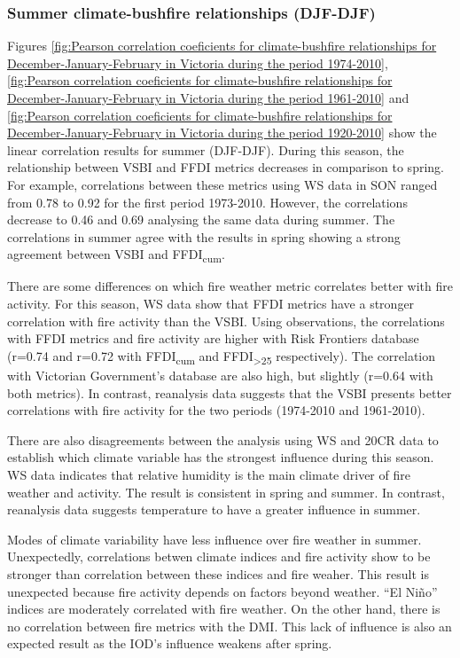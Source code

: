 \subsubsection{Summer climate-bushfire relationships (DJF-DJF)}

Figures \ref{fig:Pearson correlation coeficients for climate-bushfire relationships for December-January-February in Victoria during the period 1974-2010},
\ref{fig:Pearson correlation coeficients for climate-bushfire relationships for December-January-February in Victoria during the period 1961-2010}
and \ref{fig:Pearson correlation coeficients for climate-bushfire relationships for December-January-February in Victoria during the period 1920-2010}
show the linear correlation results for summer (DJF-DJF). During this
season, the relationship between VSBI and FFDI metrics decreases in
comparison to spring. For example, correlations between these metrics
using WS data in SON ranged from 0.78 to 0.92 for the first period
1973-2010. However, the correlations decrease to 0.46 and 0.69 analysing
the same data during summer. The correlations in summer agree with
the results in spring showing a strong agreement between VSBI and
FFDI\textsubscript{cum}.

There are some differences on which fire weather metric correlates
better with fire activity. For this season, WS data show that FFDI
metrics have a stronger correlation with fire activity than the VSBI.
Using observations, the correlations with FFDI metrics and fire activity
are higher with Risk Frontiers database (r=0.74 and r=0.72 with FFDI\textsubscript{cum}
and FFDI\textsubscript{>25} respectively). The correlation
with Victorian Government's database are also high, but slightly (r=0.64 with both
metrics). In contrast, reanalysis data suggests that the VSBI presents
better correlations with fire activity for the two periods (1974-2010
and 1961-2010).

There are also disagreements between the analysis using WS and 20CR
data to establish which climate variable has the strongest influence
during this season. WS data indicates that relative humidity is the
main climate driver of fire weather and activity. The result is consistent
in spring and summer. In contrast, reanalysis data suggests temperature
to have a greater influence in summer.

Modes of climate variability have less influence over fire weather
in summer. Unexpectedly, correlations betwen climate indices and fire activity 
show to be stronger than correlation between these indices and fire weaher. This result is 
unexpected because fire activity depends on factors beyond weather. \textquotedblleft El
Ni\~no\textquotedblright{} indices are moderately correlated with fire
weather. On the other hand, there is no correlation between fire metrics
with the DMI. This lack of influence is also an expected result as
the IOD's influence weakens after spring. 

